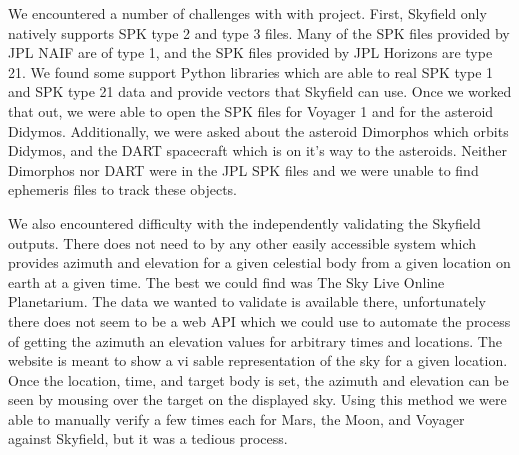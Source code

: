 \documentclass[../main.tex]{subfiles}
\begin{document}
We encountered a number of challenges with with project. First, Skyfield only natively supports SPK type 2 and type 3 files. Many of the SPK files provided by JPL NAIF\cite{NAIF} are of type 1, and the SPK files provided by JPL Horizons\cite{JPL-Horizons} are type 21. We found some support Python libraries which are able to real SPK type 1 and SPK type 21 data and provide vectors that Skyfield can use\cite{spk-01}\cite{spk-21}. Once we worked that out, we were able to open the SPK files for Voyager 1 and for the asteroid Didymos. Additionally, we were asked about the asteroid Dimorphos which orbits Didymos, and the DART spacecraft which is on it's way to the asteroids. Neither Dimorphos nor DART were in the JPL SPK files and we were unable to find ephemeris files to track these objects.

We also encountered difficulty with the independently validating the Skyfield outputs. There does not need to by any other easily accessible system which provides azimuth and elevation for a given celestial body from a given location on earth at a given time. The best we could find was The Sky Live Online Planetarium\cite{sky-live}. The data we wanted to validate is available there, unfortunately there does not seem to be a web API which we could use to automate the process of getting the azimuth an elevation values for arbitrary times and locations. The website is meant to show a vi sable representation of the sky for a given location. Once the location, time, and target body is set, the azimuth and elevation can be seen by mousing over the target on the displayed sky. Using this method we were able to manually verify a few times each for Mars, the Moon, and Voyager against Skyfield, but it was a tedious process. 
\end{document}
